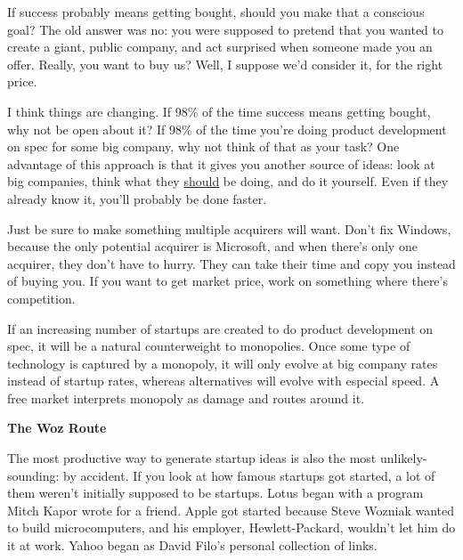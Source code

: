 If
                    success probably means getting bought, should you make that
                    a conscious goal? The old answer was no: you were supposed
                    to pretend that you wanted to create a giant, public
                    company, and act surprised when someone made you an offer.
                    Really, you want to buy us? Well, I suppose we'd consider
                    it, for the right price.

I think things are
                    changing. If 98\% of the time success means getting bought,
                    why not be open about it? If 98\% of the time you're doing
                    product development on spec for some big company, why not
                    think of that as your task? One advantage of this approach
                    is that it gives you another source of ideas: look at big
                    companies, think what they
                    \href{http://kiko.com}{should} be doing, and do it
                    yourself. Even if they already know it, you'll probably be
                    done faster.

Just be sure to make something
                    multiple acquirers will want. Don't fix Windows, because the
                    only potential acquirer is Microsoft, and when there's only
                    one acquirer, they don't have to hurry. They can take their
                    time and copy you instead of buying you. If you want to get
                    market price, work on something where there's
                    competition.

If an increasing number of startups
                    are created to do product development on spec, it will be a
                    natural counterweight to monopolies. Once some type of
                    technology is captured by a monopoly, it will only evolve at
                    big company rates instead of startup rates, whereas
                    alternatives will evolve with especial speed. A free market
                    interprets monopoly as damage and routes around it.

\textbf{The Woz Route}

The most productive way to generate startup
                    ideas is also the most unlikely-sounding: by accident. If
                    you look at how famous startups got started, a lot of them
                    weren't initially supposed to be startups. Lotus began with
                    a program Mitch Kapor wrote for a friend. Apple got started
                    because Steve Wozniak wanted to build microcomputers, and
                    his employer, Hewlett-Packard, wouldn't let him do it at
                    work. Yahoo began as David Filo's personal collection of
                    links.

